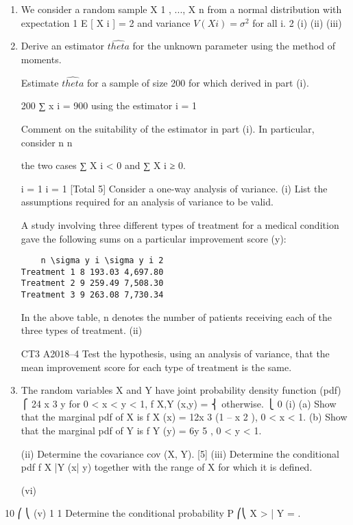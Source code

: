 \documentclass[a4paper,12pt]{article}
\begin{document}
\begin{enumerate}

\item We consider a random sample X 1 , ..., X n from a normal distribution with expectation
1
E [ X i ] =  2 and variance $V(X i ) = \sigma^2$ for all i.
2
(i)
(ii)
(iii)


\item Derive an estimator $\hat{theta}$  for the unknown parameter  using the method of
moments.

Estimate $\hat{theta}$ for a sample of size 200 for which
derived in part (i).

200
∑ x i = 900 using the estimator
i = 1

Comment on the suitability of the estimator in part (i). In particular, consider
n
n


the two cases ∑ X i < 0 and ∑ X i ≥ 0.

i = 1
i = 1
[Total 5]
Consider a one-way analysis of variance.
(i)
List the assumptions required for an analysis of variance to be valid.

A study involving three different types of treatment for a medical condition gave the
following sums on a particular improvement score (y):
\begin{verbatim}
    n \sigma y i \sigma y i 2
Treatment 1 8 193.03 4,697.80
Treatment 2 9 259.49 7,508.30
Treatment 3 9 263.08 7,730.34
\end{verbatim}

In the above table, n denotes the number of patients receiving each of the three types
of treatment.
(ii)


CT3 A2018–4
Test the hypothesis, using an analysis of variance, that the mean improvement
score for each type of treatment is the same.
\item %
The random variables X and Y have joint probability density function (pdf)
⎧ 24 x 3 y for 0 < x < y < 1,
f X,Y (x,y) = ⎨
otherwise.
⎩ 0
(i)
(a)
Show that the marginal pdf of X is
f X   (x) = 12x 3 (1 – x 2 ), 0 <
x < 1.
(b)
Show that the marginal pdf of Y is f Y   (y) = 6y 5 , 0 < y < 1.


(ii) Determine the covariance cov (X, Y).
[5]
(iii) Determine the conditional pdf f X |Y (x| y) together with the range of X for which
it is defined. 


(vi)

\end{enumerate}
10
⎛
⎝
(v)
1
1
Determine the conditional probability P ⎛⎝ X > | Y = .
\end{document}
